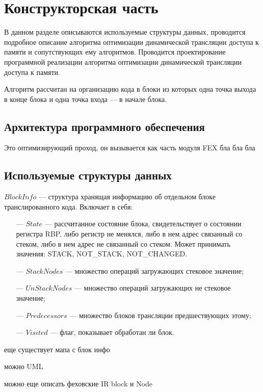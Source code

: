 \section{Конструкторская часть}

В данном разделе описываются используемые структуры данных, проводится
подробное описание алгоритма оптимизации динамической трансляции доступа к памяти и сопутствующих ему алгоритмов. Проводится проектирование программной реализации алгоритма оптимизации динамической трансляции доступа к памяти.

Алгоритм рассчитан на организацию кода в блоки из которых одна точка выхода в конце блока и одна точка входа --- в начале блока.

\subsection{Архитектура программного обеспечения}

Это оптимизирующий проход, он вызывается как часть модуля FEX бла бла бла 

\subsection{Используемые структуры данных}

$BlockInfo$ --- структура хранящая информацию об отдельном блоке транслированного кода. Включает в себя:

\begin{itemize}[leftmargin=1.6\parindent]
	\item[---] $State$ --- рассчитанное состояние блока, свидетельствует о состоянии регистра RBP, либо регистр не менялся, либо в нем адрес связанный со стеком, либо в нем адрес не связанный со стеком. Может принимать значения: STACK, NOT\_STACK, NOT\_CHANGED.
	\item[---] $StackNodes$ --- множество операций загружающих стековое значение;
	\item[---] $UnStackNodes$ --- множество операций загружающих не стековое значение;
	\item[---] $Predecessors$ --- множество блоков трансляции предшествующих этому;
	\item[---] $Visited$ --- флаг, показывает обработан ли блок.
\end{itemize}

еще существует мапа с блок инфо

можно UML

можно еще описать феховские IR block и Node

